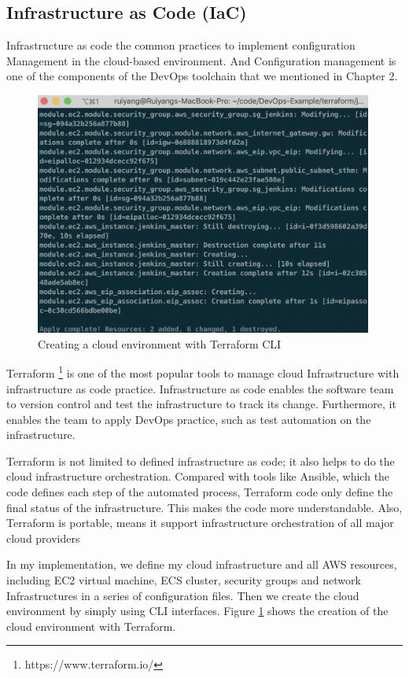 \subsection{Infrastructure as Code (IaC)}
Infrastructure as code the common practices to implement configuration Management in the cloud-based environment. And Configuration management is one of the components of the DevOps toolchain that we mentioned in Chapter 2.
\begin{figure}[h]
\centering
\includegraphics[width=0.99\textwidth]{pics/terraform.png}
\caption{Creating a cloud environment with Terraform CLI}
\label{fig:terraform}
\end{figure}
\par
Terraform \footnote{https://www.terraform.io/} is one of the most popular tools to manage cloud Infrastructure with infrastructure as code practice. Infrastructure as code enables the software team to version control and test the infrastructure to track its change. Furthermore, it enables the team to apply DevOps practice, such as test automation on the infrastructure.

Terraform is not limited to defined infrastructure as code; it also helps to do the cloud infrastructure orchestration. Compared with tools like Ansible, which the code defines each step of the automated process, Terraform code only define the final status of the infrastructure. This makes the code more understandable. Also, Terraform is portable, means it support infrastructure orchestration of all major cloud providers

In my implementation, we define my cloud infrastructure and all AWS resources, including EC2 virtual machine, ECS cluster, security groups and network Infrastructures in a series of configuration files. Then we create the cloud environment by simply using CLI interfaces. Figure \ref{fig:terraform} shows the creation of the cloud environment with Terraform.
